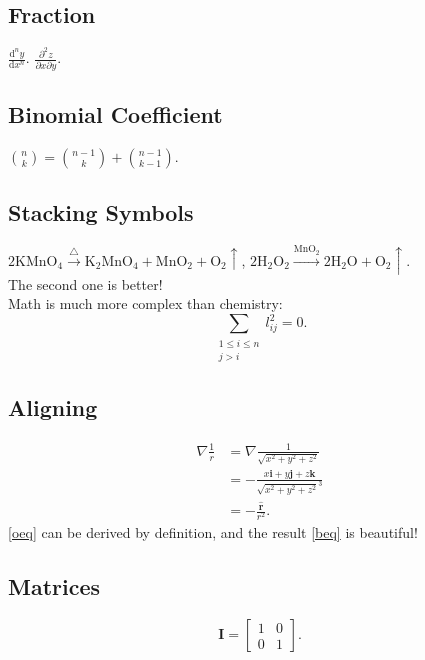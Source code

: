 \documentclass{article}
\begin{document}
    \subsection{Fraction}
    $\frac{\mathrm{d}^{n}y}{\mathrm{d}x^{n}}$.
    $\frac{\partial^{2}z}{\partial{x}\partial{y}}$.
    \subsection{Binomial Coefficient}
    $ \binom{n}{k} = \binom{n-1}{k} + \binom{n-1}{k-1}$.
    \subsection{Stacking Symbols}
    $ 2\text{K}\text{Mn}\text{O}_4 \stackrel{\triangle}{\longrightarrow}
      \text{K}_2\text{Mn}\text{O}_4+\text{Mn}\text{O}_2+\text{O}_2\uparrow $,
    $ 2\text{H}_2\text{O}_2 \xrightarrow[]{\text{Mn}\text{O}_2}
    2\text{H}_2\text{O}+\text{O}_2\uparrow $.\\
    The second one is better!\\
    Math is much more complex than chemistry:
    \begin{equation*}
        \sum_{\substack{1\le{i}\le{n}\\j>i}} l_{ij}^2 = 0.
    \end{equation*}
    \subsection{Aligning}
    \begin{align}
        \nabla\frac{1}{r} & = \nabla\frac{1}{\sqrt{x^2+y^2+z^2}} \label{oeq}\\
            & = -\frac{x\boldsymbol{i}+y\boldsymbol{j}+z\boldsymbol{k}}
                      {\sqrt{x^2+y^2+z^2}^3} \nonumber \\
            & = -\frac{\hat{\boldsymbol{r}}}{r^2}. \tag{$\star$} \label{beq}
    \end{align}
    \eqref{oeq} can be derived by definition,
    and the result \eqref{beq} is beautiful!
    \subsection{Matrices}
    \begin{equation*}
        \boldsymbol{I} = 
        \begin{bmatrix}
            1 & 0 \\
            0 & 1
        \end{bmatrix}.
    \end{equation*}
\end{document}
